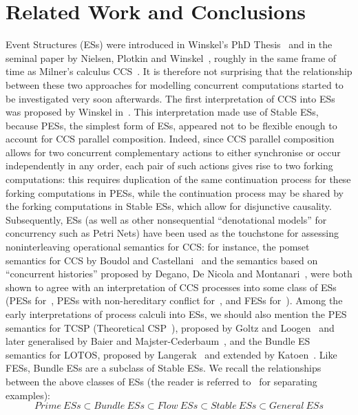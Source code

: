 
\section{Related Work and Conclusions}

Event Structures (ESs) were introduced in Winskel's PhD
Thesis~\cite{Win80} and in the seminal paper by Nielsen, Plotkin and
Winskel~\cite{NPW81}, roughly in the same frame of time as Milner's
calculus CCS~\cite{Mil80}. It is therefore not surprising that the
relationship between these two approaches for modelling concurrent
computations started to be investigated very soon afterwards. The
first interpretation of CCS into ESs was proposed by Winskel
in~\cite{Win82}. This interpretation made use of Stable ESs, because
PESs, the simplest form of ESs, appeared not to be flexible enough to
account for CCS parallel composition. Indeed, since CCS parallel
composition allows for two concurrent complementary actions to either
synchronise or occur independently in any order, each pair of such
actions gives rise to two forking computations: this requires
duplication of the same continuation process for these forking
computations in PESs, while the continuation process may be shared by
the forking computations in Stable ESs, which allow for disjunctive
causality.  Subsequently, ESs (as well as other nonsequential
``denotational models'' for concurrency such as Petri Nets) have been
used as the touchstone for assessing noninterleaving operational
semantics for CCS: for instance, the pomset semantics for CCS by
Boudol and Castellani~\cite{BC87,BC88a} and the semantics based on
``concurrent histories'' proposed by Degano, De Nicola and
Montanari~\cite{DM87,DDM88,DDM90}, were both shown to agree with an
interpretation of CCS processes into some class of ESs (PESs
for~\cite{DDM88,DDM90}, PESs with non-hereditary conflict
for~\cite{BC87}, and FESs for~\cite{BC88a}).  Among the early
interpretations of process calculi into ESs, we should also mention
the PES semantics for TCSP (Theoretical CSP~\cite{BHR84,Old86}),
proposed by Goltz and Loogen~\cite{LG91} and later generalised by
Baier and Majster-Cederbaum~\cite{BM94}, and the Bundle ES semantics
for LOTOS, proposed by Langerak~\cite{Lan93} and extended by
Katoen~\cite{Kat96}.  Like FESs, Bundle ESs are a subclass of Stable
ESs. We recall the relationships between the above
classes of ESs (the reader is referred to~\cite{BC94} for separating examples):
\[
Prime~ESs \subset Bundle~ESs \subset Flow~ESs \subset
  Stable~ESs \subset General~ESs 
  \]

